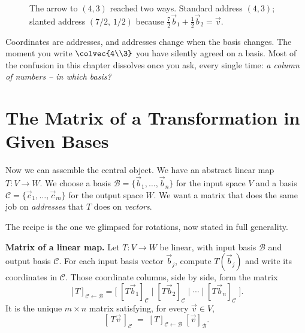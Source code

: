 \begin{figure}[H]
\centering
{}
\caption{The arrow to $(4,3)$ reached two ways. Standard address $(4,3)$; slanted
address $(7/2,\,1/2)$ because $\tfrac72\vec{b}_1+\tfrac12\vec{b}_2=\vec{v}$.}
\label{ch31:fig-two-addresses}
\end{figure}

\begin{focusbox}
Coordinates are addresses, and addresses change when the basis changes. The
moment you write $\colvec{4\\3}$ you have silently agreed on a basis. Most of the
confusion in this chapter dissolves once you ask, every single time: \emph{a
column of numbers -- in which basis?}
\end{focusbox}

\section{The Matrix of a Transformation in Given Bases}
\label{ch31:matrix-of-T}

Now we can assemble the central object. We have an abstract linear map
$T:V\to W$. We choose a basis $\mathcal{B}=\{\vec{b}_1,\dots,\vec{b}_n\}$ for the
input space $V$ and a basis $\mathcal{C}=\{\vec{c}_1,\dots,\vec{c}_m\}$ for the
output space $W$. We want a matrix that does the same job on \emph{addresses} that
$T$ does on \emph{vectors}.

The recipe is the one we glimpsed for rotations, now stated in full generality.

\begin{formalbox}
\textbf{Matrix of a linear map.} Let $T:V\to W$ be linear, with input basis
$\mathcal{B}$ and output basis $\mathcal{C}$. For each input basis vector
$\vec{b}_j$, compute $T(\vec{b}_j)$ and write its coordinates in $\mathcal{C}$.
Those coordinate columns, side by side, form the matrix
\[
  [T]_{\mathcal{C}\leftarrow\mathcal{B}}
  = \Big[\; [T\vec{b}_1]_{\mathcal{C}} \;\big|\; [T\vec{b}_2]_{\mathcal{C}}
     \;\big|\; \cdots \;\big|\; [T\vec{b}_n]_{\mathcal{C}} \;\Big].
\]
It is the unique $m\times n$ matrix satisfying, for every $\vec{v}\in V$,
\[
  [\,T\vec{v}\,]_{\mathcal{C}} \;=\; [T]_{\mathcal{C}\leftarrow\mathcal{B}}\;[\vec{v}]_{\mathcal{B}}.
\]
\end{formalbox}


